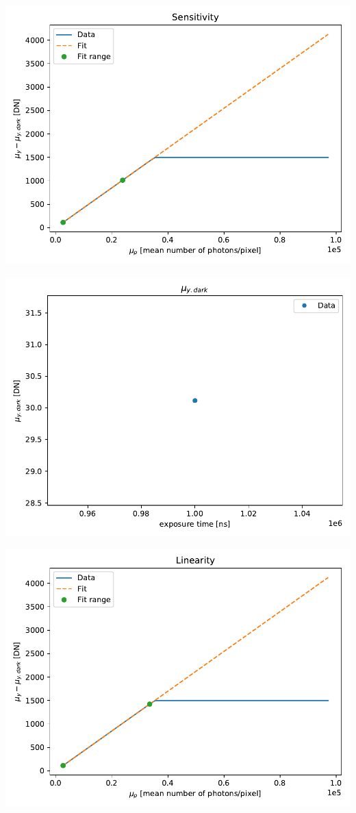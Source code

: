 \documentclass[a4paper,twoside,12pt,american,hidelinks]{article}
\begin{document}
\newpage
\begin{center}
\includegraphics[height=0.45\textheight,keepaspectratio]{OP1/PlotSensitivity.pdf}
\end{center}
\begin{center}
\includegraphics[height=0.45\textheight,keepaspectratio]{OP1/PlotUyDark.pdf}
\end{center}
\vfill
\newpage
\begin{center}
\includegraphics[height=0.45\textheight,keepaspectratio]{OP1/PlotLinearity.pdf}
\end{center}
\end{document}
